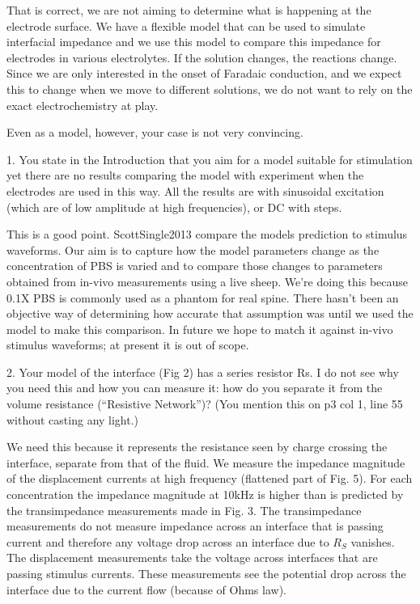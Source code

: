\documentclass[journal, a4paper]{IEEEtran}
\begin{document}
{    {
        \color{blue}
        That is correct, we are not aiming to determine what is happening at the electrode surface. We have a flexible model that can be used to simulate interfacial impedance and we use this model to compare this impedance for electrodes in various electrolytes. If the solution changes, the reactions change. Since we are only interested in the onset of Faradaic conduction, and we expect this to change when we move to different solutions, we do not want to rely on the exact electrochemistry at play.

    }


    Even as a model, however, your case is not very convincing.

    1. You state in the Introduction that you aim for a model suitable for stimulation yet there are no results comparing the model with experiment when the electrodes are used in this way. All the results are with sinusoidal excitation (which are of low amplitude at high frequencies), or DC with steps.

    {
        \color{blue}
        This is a good point. ScottSingle2013 compare the models prediction to stimulus waveforms. Our aim is to capture how the model parameters change as the concentration of PBS is varied and to compare those changes to parameters obtained from in-vivo measurements using a live sheep. We're doing this because 0.1X PBS is commonly used as a phantom for real spine. There hasn't been an objective way of determining how accurate that assumption was until we used the model to make this comparison. In future we hope to match it against in-vivo stimulus waveforms; at present it is out of scope.
    }

    2. Your model of the interface (Fig 2) has a series resistor Rs. I do not see why you need this and how you can measure it: how do you separate it from the volume resistance (``Resistive Network'')? (You mention this on p3 col 1, line 55 without casting any light.)

    {
        \color{blue}
        We need this because it represents the resistance seen by charge crossing the interface, separate from that of the fluid.
        We measure the impedance magnitude of the displacement currents at high frequency (flattened part of Fig. 5). For each concentration the impedance magnitude at 10kHz is higher than is predicted by the transimpedance measurements made in Fig. 3. The transimpedance measurements do not measure impedance across an interface that is passing current and therefore any voltage drop across an interface due to $R_{S}$ vanishes. The displacement measurements take the voltage across interfaces that are passing stimulus currents. These measurements see the potential drop across the interface due to the current flow (because of Ohms law).

}}
\end{document}
